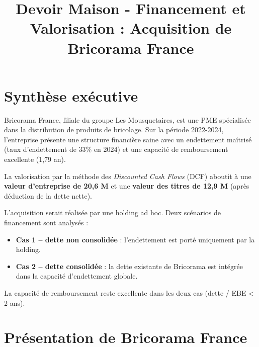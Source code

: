 \documentclass{rapportECL}
\title{Devoir Maison - Financement et Valorisation : Acquisition de Bricorama France}
\begin{document}




        
\fairemarges
\fairepagedegarde
\tabledematieres

\section{Synthèse exécutive}

Bricorama France, filiale du groupe Les Mousquetaires, est une PME spécialisée dans la distribution de produits de bricolage. Sur la période 2022-2024, l'entreprise présente une structure financière saine avec un endettement maîtrisé (taux d'endettement de 33\% en 2024) et une capacité de remboursement excellente (1,79 an).

La valorisation par la méthode des \textit{Discounted Cash Flows} (DCF) aboutit à une \textbf{valeur d'entreprise de 20,6 M\text{\euro}} et une \textbf{valeur des titres de 12,9 M\text{\euro}} (après déduction de la dette nette).

L'acquisition serait réalisée par une holding ad hoc. Deux scénarios de financement sont analysés :

\begin{itemize}[nosep]
    \item \textbf{Cas 1 -- dette non consolidée} : l'endettement est porté uniquement par la holding.
    \item \textbf{Cas 2 -- dette consolidée} : la dette existante de Bricorama est intégrée dans la capacité d'endettement globale.
\end{itemize}

La capacité de remboursement reste excellente dans les deux cas (dette / EBE < 2 ans).

\section{Présentation de Bricorama France}
\end{document}
